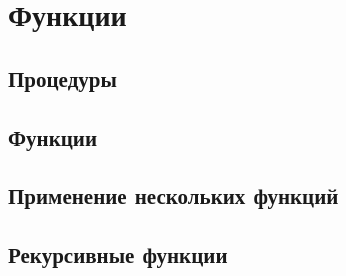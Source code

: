 \section{Функции}

\subsection{Процедуры}

\task

\task

\task

\task

\task

\task

\task

\task

\task

\task

\subsection{Функции}

\task

\task

\task

\task

\task

\task

\task

\task

\task

\task

\subsection{Применение нескольких функций}

\task

\task

\task

\task

\task

\task

\task

\task

\task

\task

\subsection{Рекурсивные функции}

\task

\task

\task

\task

\task

\task

\task

\task

\task

\task
